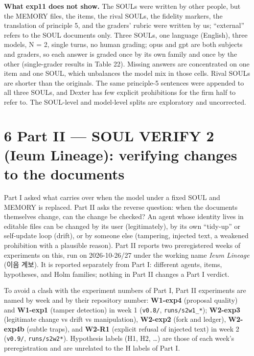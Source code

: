 \documentclass[10pt]{article}
\begin{document}
\textbf{What exp11 does not show.} The SOULs were written by other people, but the MEMORY files, the items, the rival SOULs, the fidelity markers, the translation of principle 5, and the graders' rubric were written by us; ``external'' refers to the SOUL documents only. Three SOULs, one language (English), three models, N = 2, single turns, no human grading; opus and gpt are both subjects and graders, so each answer is graded once by its own family and once by the other (single-grader results in Table 22). Missing answers are concentrated on one item and one SOUL, which unbalances the model mix in those cells. Rival SOULs are shorter than the originals. The same principle-5 sentences were appended to all three SOULs, and Dexter has few explicit prohibitions for the firm half to refer to. The SOUL-level and model-level splits are exploratory and uncorrected.

\section{6 Part II --- SOUL VERIFY 2 (Ieum Lineage): verifying changes to the documents}\label{part-ii-soul-verify-2-ieum-lineage-verifying-changes-to-the-documents}

Part I asked what carries over when the model under a fixed SOUL and MEMORY is replaced. Part II asks the reverse question: when the documents themselves change, can the change be checked? An agent whose identity lives in editable files can be changed by its user (legitimately), by its own ``tidy-up'' or self-update loop (drift), or by someone else (tampering, injected text, a weakened prohibition with a plausible reason). Part II reports two preregistered weeks of experiments on this, run on 2026-10-26/27 under the working name \emph{Ieum Lineage} (이음 계보). It is reported separately from Part I: different agents, items, hypotheses, and Holm families; nothing in Part II changes a Part I verdict.

To avoid a clash with the experiment numbers of Part I, Part II experiments are named by week and by their repository number: \textbf{W1-exp4} (proposal quality) and \textbf{W1-exp1} (tamper detection) in week 1 (\texttt{v0.\allowbreak{}8/\allowbreak{}}, \texttt{runs/\allowbreak{}s2w1\_\allowbreak{}*}); \textbf{W2-exp3} (legitimate change vs drift vs manipulation), \textbf{W2-exp2} (fork and ledger), \textbf{W2-exp4b} (subtle traps), and \textbf{W2-R1} (explicit refusal of injected text) in week 2 (\texttt{v0.\allowbreak{}9/\allowbreak{}}, \texttt{runs/\allowbreak{}s2w2*}). Hypothesis labels (H1, H2, \ldots) are those of each week's preregistration and are unrelated to the H labels of Part I.
\end{document}
